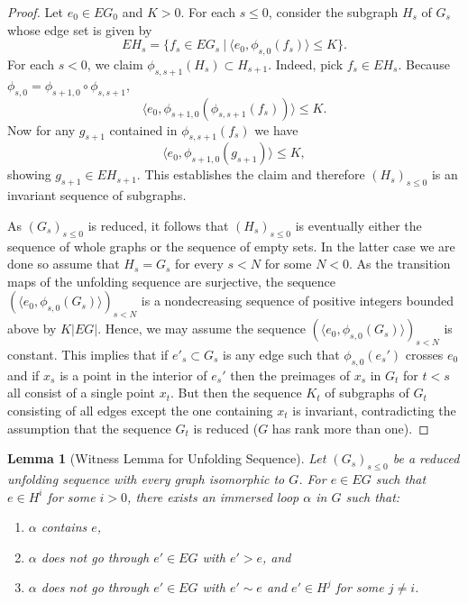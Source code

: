 \documentclass[11pt, letterpaper]{amsart}
\theoremstyle{plain}
\newtheorem{lemma}[theorem]{Lemma}
\theoremstyle{definition}
\begin{document}
\begin{proof} 
  Let $e_0 \in EG_0$ and $K>0$. For each $s \le 0$, consider the subgraph $H_s$ of $G_s$
  whose edge set is given by
  \[
    EH_s = \{f_s \in EG_s\ |\ \langle e_0, \phi_{s,0}(f_s) \rangle \le K \}.
  \]
  For each $s < 0$, we claim $\phi_{s,s+1}(H_s) \subset H_{s+1}$. Indeed, pick
  $f_s \in EH_s$. Because $\phi_{s,0} =
  \phi_{s+1,0} \circ \phi_{s,s+1}$, 
  \[
    \langle e_0, \phi_{s+1,0}(\phi_{s,s+1}(f_s)) \rangle \le K.
  \]
  Now for any $g_{s+1}$ contained in $\phi_{s,s+1}(f_s)$
  we have
  \[
    \langle e_0, \phi_{s+1,0}(g_{s+1}) \rangle \le K,
  \]
  showing $g_{s+1} \in EH_{s+1}$. This establishes the claim and
  therefore $(H_s)_{s \le 0}$ is an invariant sequence of subgraphs.

  As $(G_s)_{s \le 0}$ is reduced, it follows that $(H_s)_{s \le 0}$ is eventually either
  the sequence of whole graphs or the sequence of empty sets. In the
  latter case we are done so
  assume that $H_s = G_s$ for every $s<N$ for some $N<0$.
  As the transition maps of the unfolding sequence are surjective, the sequence $(\langle e_0, \phi_{s, 0}(G_s)
  \rangle)_{s<N}$ is a nondecreasing sequence of positive integers bounded above by $K|EG|$. Hence,
  we may assume the sequence $(\langle e_0, \phi_{s, 0}(G_s) \rangle)_{s<N}$ is
  constant. This implies that if $e'_s\subset G_s$ is any edge such
  that $\phi_{s,0}(e_s')$ crosses $e_0$ and if $x_s$ is a point in the
  interior of $e_s'$ then the preimages of $x_s$
  in $G_t$ for $t<s$ all consist of a single point $x_t$. But then the
  sequence $K_t$ of subgraphs of $G_t$ consisting of all edges except
  the one containing $x_t$ is invariant, contradicting
  the assumption that the sequence $G_t$ is reduced ($G$ has rank
  more than one). 
\end{proof}

\begin{lemma}[Witness Lemma for Unfolding Sequence] \label{lem:witness-unfolding}
  Let $(G_s)_{s \le 0}$ be a reduced unfolding sequence with every graph isomorphic to
  $G$. For $e \in EG$ such that $e \in H^i$ for some $i>0$, there exists an immersed loop
  $\alpha$ in $G$ such that:
  \begin{enumerate}[label=(\arabic*)]
  \item $\alpha$ contains $e$,
  \item $\alpha$ does not go through $e' \in EG$ with
    $e' > e$, and
  \item $\alpha$ does not go through $e' \in EG$ with $e' \sim e$ and $e' \in
    H^j$ for some $j\neq i$.
  \end{enumerate}
\end{lemma}
\end{document}
